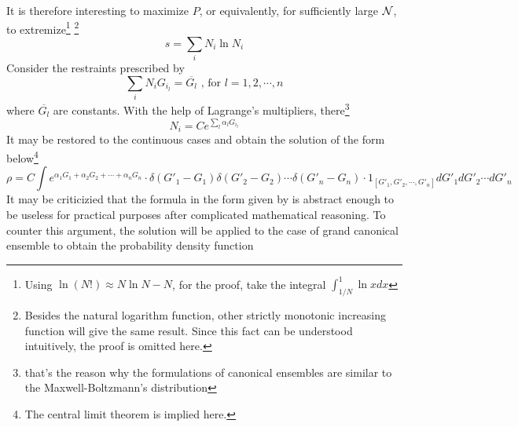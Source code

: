 It is therefore interesting to maximize $P$, or equivalently, for sufficiently large $\mathcal N$, to extremize\footnote{Using $\ln (N!)\approx N\ln N-N$, for the proof, take the integral $\int_{1/N}^{1}\ln xdx$}%
\footnote{Besides the natural logarithm function, other strictly monotonic increasing function will give the same result. Since this fact can be understood intuitively, the proof is omitted here.}
\begin{equation}
    s=\sum_{i}N_i\ln N_i
    \label{gs}
\end{equation}
Consider the restraints prescribed by
\begin{equation}
    \sum_i N_iG_{i_{l}}=\overline{G_l}\text{\ \  , for } l=1,2,\cdots ,n
    \label{cons}
\end{equation}
where $\overline{G_l}$ are constants. With the help of Lagrange's multipliers, there\footnote{that's the reason why the formulations of canonical ensembles are similar to the Maxwell-Boltzmann's distribution}
\begin{equation}
    N_i=Ce^{\sum_l\alpha_lG_{i_{l}}}
    \label{lag}
\end{equation}
It may be restored to the continuous cases and obtain the solution of the form below\footnote{The central limit theorem is implied here.}
\begin{equation}\label{solution}
\rho=C\int e^{\alpha_1G_1+\alpha_2G_2+\cdots +\alpha_nG_n}\cdot\delta(G'_1-G_1)\delta(G'_2-G_2)\cdots\delta(G'_n-G_n)\cdot 1_{[G'_1,G'_2,\cdots ,G'_n]}dG'_1dG'_2\cdots dG'_n
\end{equation}
It may be criticizied that the formula in the form given by  is abstract enough to be useless for practical purposes after complicated mathematical reasoning.
To counter this argument, the solution  will be applied to the case of grand canonical ensemble to obtain the probability density function

